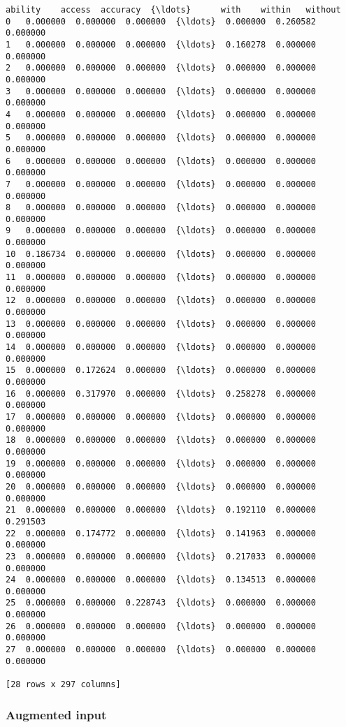 \documentclass[11pt]{article}
\begin{document}
    \begin{Verbatim}[commandchars=\\\{\}]
     ability    access  accuracy  {\ldots}      with    within   without
0   0.000000  0.000000  0.000000  {\ldots}  0.000000  0.260582  0.000000
1   0.000000  0.000000  0.000000  {\ldots}  0.160278  0.000000  0.000000
2   0.000000  0.000000  0.000000  {\ldots}  0.000000  0.000000  0.000000
3   0.000000  0.000000  0.000000  {\ldots}  0.000000  0.000000  0.000000
4   0.000000  0.000000  0.000000  {\ldots}  0.000000  0.000000  0.000000
5   0.000000  0.000000  0.000000  {\ldots}  0.000000  0.000000  0.000000
6   0.000000  0.000000  0.000000  {\ldots}  0.000000  0.000000  0.000000
7   0.000000  0.000000  0.000000  {\ldots}  0.000000  0.000000  0.000000
8   0.000000  0.000000  0.000000  {\ldots}  0.000000  0.000000  0.000000
9   0.000000  0.000000  0.000000  {\ldots}  0.000000  0.000000  0.000000
10  0.186734  0.000000  0.000000  {\ldots}  0.000000  0.000000  0.000000
11  0.000000  0.000000  0.000000  {\ldots}  0.000000  0.000000  0.000000
12  0.000000  0.000000  0.000000  {\ldots}  0.000000  0.000000  0.000000
13  0.000000  0.000000  0.000000  {\ldots}  0.000000  0.000000  0.000000
14  0.000000  0.000000  0.000000  {\ldots}  0.000000  0.000000  0.000000
15  0.000000  0.172624  0.000000  {\ldots}  0.000000  0.000000  0.000000
16  0.000000  0.317970  0.000000  {\ldots}  0.258278  0.000000  0.000000
17  0.000000  0.000000  0.000000  {\ldots}  0.000000  0.000000  0.000000
18  0.000000  0.000000  0.000000  {\ldots}  0.000000  0.000000  0.000000
19  0.000000  0.000000  0.000000  {\ldots}  0.000000  0.000000  0.000000
20  0.000000  0.000000  0.000000  {\ldots}  0.000000  0.000000  0.000000
21  0.000000  0.000000  0.000000  {\ldots}  0.192110  0.000000  0.291503
22  0.000000  0.174772  0.000000  {\ldots}  0.141963  0.000000  0.000000
23  0.000000  0.000000  0.000000  {\ldots}  0.217033  0.000000  0.000000
24  0.000000  0.000000  0.000000  {\ldots}  0.134513  0.000000  0.000000
25  0.000000  0.000000  0.228743  {\ldots}  0.000000  0.000000  0.000000
26  0.000000  0.000000  0.000000  {\ldots}  0.000000  0.000000  0.000000
27  0.000000  0.000000  0.000000  {\ldots}  0.000000  0.000000  0.000000

[28 rows x 297 columns]
    \end{Verbatim}

    \subsubsection{Augmented input}\label{augmented-input}
\end{document}
